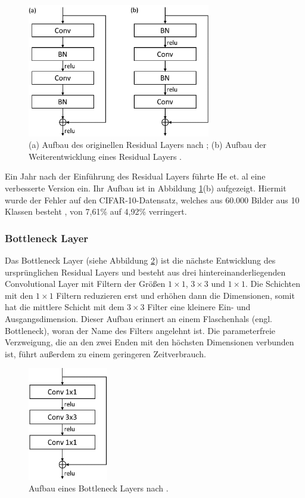 \begin{figure}[h!]
\centering
\includegraphics[width=8cm]{98_images/residual_layers.png}
\caption{(a) Aufbau des originellen Residual Layers nach \cite{deep-residual-learning}; (b) Aufbau der Weiterentwicklung eines Residual Layers \cite{identity-mappings-in-drn}.}
\label{fig:residual}
\end{figure}

\mypar Ein Jahr nach der Einführung des Residual Layers führte He et. al \cite{identity-mappings-in-drn} eine verbesserte Version ein. Ihr Aufbau ist in Abbildung \ref{fig:residual}(b) aufgezeigt. Hiermit wurde der Fehler auf den CIFAR-10-Datensatz, welches aus 60.000 Bilder aus 10 Klassen besteht \cite{krizhevsky2009learning}, von 7,61\% auf 4,92\% verringert. \cite{identity-mappings-in-drn}


\subsubsection{Bottleneck Layer}
Das Bottleneck Layer (siehe Abbildung \ref{fig:bottleneck}) ist die nächste Entwicklung des ursprünglichen Residual Layers und besteht aus drei hintereinanderliegenden Convolutional Layer mit Filtern der Größen $1\times1$, $3\times3$ und $1\times1$. Die Schichten mit den $1\times1$ Filtern reduzieren erst und erhöhen dann die Dimensionen, somit hat die mittlere Schicht mit dem $3\times3$ Filter eine kleinere Ein- und Ausgangsdimension. Dieser Aufbau erinnert an einem Flaschenhals (engl. Bottleneck), woran der Name des Filters angelehnt ist. Die parameterfreie Verzweigung, die an den zwei Enden mit den höchsten Dimensionen verbunden ist, führt außerdem zu einem geringeren Zeitverbrauch. \cite{deep-residual-learning}

\begin{figure}[h!]
\centering
\includegraphics[width=3.5cm]{98_images/bottleneck_layer.png}
\caption{Aufbau eines Bottleneck Layers nach \cite{deep-residual-learning}.}
\label{fig:bottleneck}
\end{figure}


